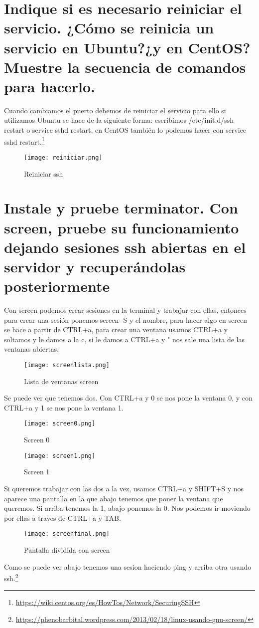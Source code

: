 \section{Indique si es necesario reiniciar el servicio. ¿Cómo se reinicia un servicio en Ubuntu?¿y en CentOS? Muestre la secuencia de comandos para hacerlo.}
Cuando cambiamos el puerto debemos de reiniciar el servicio para ello si utilizamos Ubuntu se hace de la siguiente forma: escribimos /etc/init.d/ssh restart o service sshd restart, en CentOS también lo podemos hacer con service sshd restart.\footnote{\url{https://wiki.centos.org/es/HowTos/Network/SecuringSSH}}
\begin{figure}[H] 
\centering
\texttt{[image: reiniciar.png]}  
\label{figura7:}
\caption{Reiniciar ssh}
\end{figure}
\section{Instale y pruebe terminator. Con screen, pruebe su funcionamiento dejando sesiones ssh abiertas en el servidor y recuperándolas posteriormente}
Con screen podemos crear sesiones en la terminal y trabajar con ellas, entonces para crear una sesión ponemos screen -S y el nombre, para hacer algo en screen se hace a partir de CTRL+a, para crear una ventana usamos CTRL+a y soltamos y le damos a la c, si le damos a CTRL+a y " nos sale una lista de las ventanas abiertas.
\begin{figure}[H] 
\centering
\texttt{[image: screenlista.png]}  
\label{figura8:}
\caption{Lista de ventanas screen}
\end{figure}
Se puede ver que tenemos dos. Con CTRL+a y 0 se nos pone la ventana 0, y con CTRL+a y 1 se nos pone la ventana 1.
\begin{figure}[H] 
\centering
\texttt{[image: screen0.png]}  
\label{figura9:}
\caption{Screen 0}
\end{figure}
\begin{figure}[H] 
\centering
\texttt{[image: screen1.png]}  
\label{figura10:}
\caption{Screen 1}
\end{figure}
Si queremos trabajar con las dos a la vez, usamos CTRL+a y SHIFT+S y nos aparece una pantalla en la que abajo tenemos que poner la ventana que queremos. Si arriba tenemos la 1, abajo ponemos la 0.
Nos podemos ir moviendo por ellas a traves de CTRL+a y TAB.
\begin{figure}[H] 
\centering
\texttt{[image: screenfinal.png]}  
\label{figura11:}
\caption{Pantalla dividida con screen}
\end{figure}
Como se puede ver abajo tenemos una sesion haciendo ping y arriba otra usando ssh.\footnote{\url{https://phenobarbital.wordpress.com/2013/02/18/linux-usando-gnu-screen/}}
